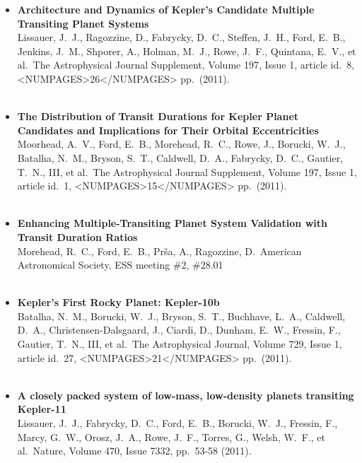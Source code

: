 \documentclass[11pt,letterpaper,sans]{moderncv} %
\begin{document}
\begin{itemize}
 \item \textbf{ Architecture and Dynamics of Kepler's Candidate 
Multiple Transiting Planet Systems } \\ Lissauer, J.~J., Ragozzine, D., 
Fabrycky, D.~C., Steffen, J.~H., Ford, E.~B., Jenkins, J.~M., Shporer, A., 
Holman, M.~J., Rowe, J.~F., Quintana, E.~V., et al.\ The Astrophysical 
Journal Supplement, Volume 197, Issue 1, article id.~8, <NUMPAGES>26</NUMPAGES> pp.~(2011).\ 
\\ \\ 

 \item \textbf{ The Distribution of Transit Durations for Kepler 
Planet Candidates and Implications for Their Orbital Eccentricities } \\ 
Moorhead, A.~V., Ford, E.~B., Morehead, R.~C., Rowe, J., Borucki, W.~J., 
Batalha, N.~M., Bryson, S.~T., Caldwell, D.~A., Fabrycky, D.~C., Gautier, 
T.~N., III, et al.\ The Astrophysical Journal Supplement, Volume 197, Issue 
1, article id.~1, <NUMPAGES>15</NUMPAGES> pp.~(2011).\ \\ \\ 

 \item \textbf{ Enhancing Multiple-Transiting Planet System Validation 
with Transit Duration Ratios } \\ Morehead, R.~C., Ford, E.~B., Pr{\v s}a, 
A., Ragozzine, D.\ American Astronomical Society, ESS meeting \#2, \#28.01 
\\ \\ 

 \item \textbf{ Kepler's First Rocky Planet: Kepler-10b } \\ Batalha, 
N.~M., Borucki, W.~J., Bryson, S.~T., Buchhave, L.~A., Caldwell, D.~A., 
Christensen-Dalsgaard, J., Ciardi, D., Dunham, E.~W., Fressin, F., Gautier, 
T.~N., III, et al.\ The Astrophysical Journal, Volume 729, Issue 1, article 
id.~27, <NUMPAGES>21</NUMPAGES> pp.~(2011).\ \\ \\ 

 \item \textbf{ A closely packed system of low-mass, low-density 
planets transiting Kepler-11 } \\ Lissauer, J.~J., Fabrycky, D.~C., Ford, 
E.~B., Borucki, W.~J., Fressin, F., Marcy, G.~W., Orosz, J.~A., Rowe, 
J.~F., Torres, G., Welsh, W.~F., et al.\ Nature, Volume 470, Issue 7332, 
pp.~53-58 (2011).\ \\ \\ 


\end{itemize}
\end{document}
